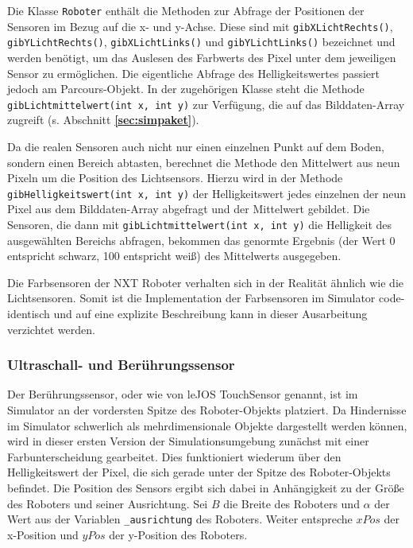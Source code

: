 \documentclass[paper=a4, DIV=calc, BCOR=12mm, twoside=on, onecolumn=on, open = right, titlepage =on, parskip =half-, headsepline = on, footsepline = off, chapterprefix = off, appendixprefix = on, fontsize = 12pt, numbers = noenddot, abstract = on]{scrbook}
\begin{document}
Die Klasse \texttt{Roboter} enthält die Methoden zur Abfrage der Positionen der Sensoren im Bezug auf die x- und y-Achse. Diese sind mit \texttt{gib\-X\-Licht\-Rechts()}, \texttt{gib\-Y\-Licht\-Rechts()}, \texttt{gib\-X\-Licht\-Links()} und \texttt{gib\-Y\-Licht\-Links()} bezeichnet und werden benötigt, um das Auslesen des Farbwerts des Pixel unter dem jeweiligen Sensor zu ermöglichen. Die eigentliche Abfrage des Helligkeitswertes passiert jedoch am Parcours-Objekt. In der zugehörigen Klasse steht die Methode \texttt{gibLichtmittelwert(int x, int y)} zur Verfügung, die auf das Bilddaten-Array zugreift (s. Abschnitt \textbf{\ref{sec:simpaket}}).

Da die realen Sensoren auch nicht nur einen einzelnen Punkt auf dem Boden, sondern einen Bereich abtasten, berechnet die Methode den Mittelwert aus neun Pixeln um die Position des Lichtsensors. Hierzu wird in der Methode \texttt{gib\-Hellig\-keits\-wert(int x, int y)} der Helligkeitswert jedes einzelnen der neun Pixel aus dem Bilddaten-Array abgefragt und der Mittelwert gebildet. Die Sensoren, die dann mit \texttt{gib\-Licht\-mittel\-wert(int x, int y)} die Helligkeit des ausgewählten Bereichs abfragen, bekommen das genormte Ergebnis (der Wert 0 entspricht schwarz, 100 entspricht weiß) des Mittelwerts ausgegeben.

Die Farbsensoren der NXT Roboter verhalten sich in der Realität ähnlich wie die Lichtsensoren. Somit ist die Implementation der Farbsensoren im Simulator code-identisch und auf eine explizite Beschreibung kann in dieser Ausarbeitung verzichtet werden.

\subsubsection{Ultraschall- und Berührungssensor}
Der Berührungssensor, oder wie von leJOS TouchSensor genannt, ist im Simulator an der vordersten Spitze des Roboter-Objekts platziert. Da Hindernisse im Simulator schwerlich als mehrdimensionale Objekte dargestellt werden können, wird in dieser ersten Version der Simulationsumgebung zunächst mit einer Farbunterscheidung gearbeitet. Dies funktioniert wiederum über den Helligkeitswert der Pixel, die sich gerade unter der Spitze des Roboter-Objekts befindet. Die Position des Sensors ergibt sich dabei in Anhängigkeit zu der Größe des Roboters und seiner Ausrichtung. Sei $B$ die Breite des Roboters und $\alpha$ der Wert aus der Variablen \texttt{{\_}ausrichtung} des Roboters. Weiter entspreche $xPos$ der x-Position und $yPos$ der y-Position des Roboters.
\end{document}
